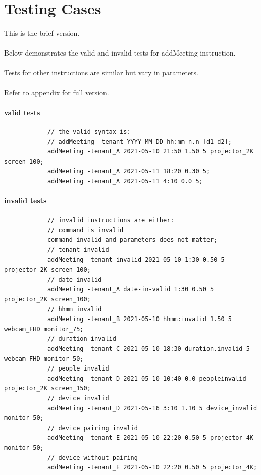 \documentclass{article}
\begin{document}
    \cleardoublepage
    \section{Testing Cases}
        \paragraph{}
        This is the brief version. 
        \paragraph{}
        Below demonstrates the valid and invalid tests for addMeeting instruction.
        \paragraph{}
        Tests for other instructions are similar but vary in parameters. 
        \paragraph{}
        Refer to appendix for full version. 

        \paragraph{valid tests}
        \begin{verbatim}
            // the valid syntax is: 
            // addMeeting –tenant YYYY-MM-DD hh:mm n.n [d1 d2]; 
            addMeeting -tenant_A 2021-05-10 21:50 1.50 5 projector_2K screen_100;
            addMeeting -tenant_A 2021-05-11 18:20 0.30 5;
            addMeeting -tenant_A 2021-05-11 4:10 0.0 5;
        \end{verbatim}
        
        
        \paragraph{invalid tests}
        \begin{verbatim}
            // invalid instructions are either:
            // command is invalid
            command_invalid and parameters does not matter;
            // tenant invalid
            addMeeting -tenant_invalid 2021-05-10 1:30 0.50 5 projector_2K screen_100;
            // date invalid
            addMeeting -tenant_A date-in-valid 1:30 0.50 5 projector_2K screen_100;
            // hhmm invalid
            addMeeting -tenant_B 2021-05-10 hhmm:invalid 1.50 5 webcam_FHD monitor_75;
            // duration invalid 
            addMeeting -tenant_C 2021-05-10 18:30 duration.invalid 5 webcam_FHD monitor_50;
            // people invalid
            addMeeting -tenant_D 2021-05-10 10:40 0.0 peopleinvalid projector_2K screen_150;
            // device invalid
            addMeeting -tenant_D 2021-05-16 3:10 1.10 5 device_invalid monitor_50;
            // device pairing invalid 
            addMeeting -tenant_E 2021-05-10 22:20 0.50 5 projector_4K monitor_50; 
            // device without pairing 
            addMeeting -tenant_E 2021-05-10 22:20 0.50 5 projector_4K; 
        \end{verbatim}
\end{document}
